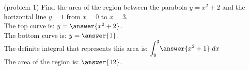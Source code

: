 \documentclass{ximera}
\begin{document}
\begin{example}[example 1]
\begin{image}
\end{image}

\end{example}




\begin{problem}(problem 1)
Find the area of the region between the parabola $y = x^2 + 2$ and the horizontal line $y =1$ from $x = 0$ to $x = 3$.\\
The top curve is: $y = \answer{x^2 + 2}$.\\
The bottom curve is: $y = \answer{1}$.\\
The definite integral that represents this area is: $\displaystyle{\int_0^{3}} \answer{x^2 + 1} \; dx$\\
The area of the region is: $\answer{12}$.
\end{problem}
\end{document}
